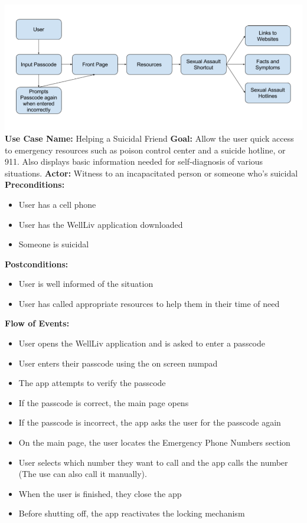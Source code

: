 \documentclass[letterpaper,12pt,titlepage]{article}
\begin{document}
\includegraphics[scale=.4]{Case2}
\newpage
\noindent
\textbf{Use Case Name:} Helping a Suicidal Friend
\newline
\newline
\textbf{Goal:} Allow the user quick access to emergency resources such as poison control center and a suicide hotline, or 911. Also displays basic information needed for self-diagnosis of various situations.
\newline
\newline
\textbf{Actor:} Witness to an incapacitated person or someone who’s suicidal
\newline
\newline
\textbf{Preconditions:}
\begin{itemize}
\item User has a cell phone
\item User has the WellLiv application downloaded
\item Someone is suicidal
\end{itemize}
\textbf{Postconditions:}
\begin{itemize}
\item User is well informed of the situation
\item User has called appropriate resources to help them in their time of need
\end{itemize}
\textbf{Flow of Events:}
\begin{itemize}
\item User opens the WellLiv application and is asked to enter a passcode
\item User enters their passcode using the on screen numpad
\item The app attempts to verify the passcode
\item If the passcode is correct, the main page opens
\item If the passcode is incorrect, the app asks the user for the passcode again
\item On the main page, the user locates the Emergency Phone Numbers section
\item User selects which number they want to call and the app calls the  number (The use can also call it manually).
\item When the user is finished, they close the app
\item Before shutting off, the app reactivates the locking mechanism
\end{itemize}
\end{document}
